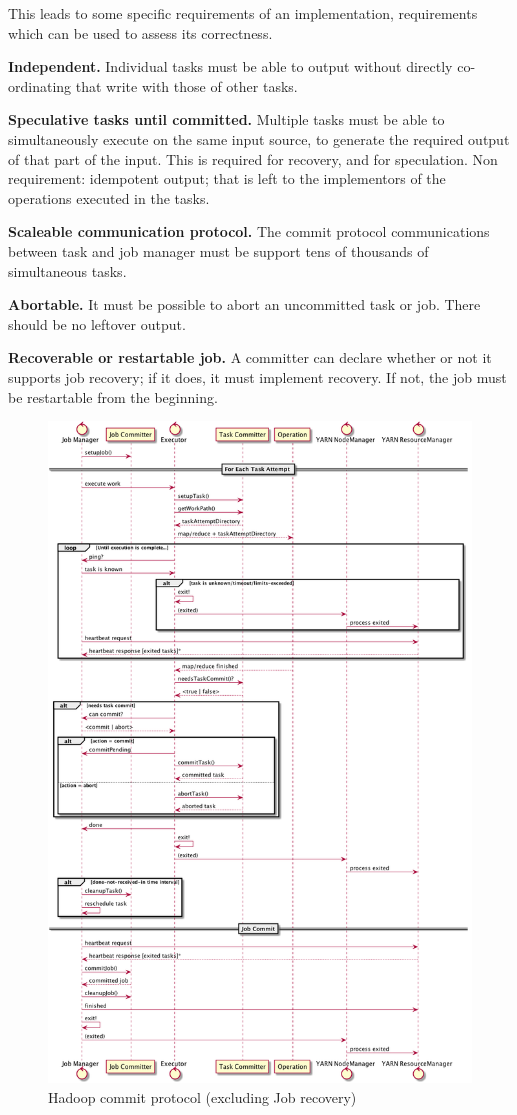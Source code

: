 \documentclass[conference]{IEEEtran}
\begin{document}
This leads to some specific requirements of an implementation, requirements
which can be used to assess its correctness.

\textbf{Independent.}
Individual tasks must be able to output without directly
co-ordinating that write with those of other tasks.

\textbf{Speculative tasks until committed.}
Multiple tasks must be able to simultaneously execute on the same input
source, to generate the required output of that part of the input.
This is required for recovery, and for speculation.
Non requirement: idempotent output;
that is left to the implementors of the operations executed in the tasks.

\textbf{Scaleable communication protocol.}
The commit protocol communications between task and job manager
must be support tens of thousands of simultaneous tasks.

\textbf{Abortable.}
It must be possible to abort an uncommitted task or job.
There should be no leftover output.

\textbf{Recoverable or restartable job.}
A committer can declare whether or not it supports job recovery;
if it does, it must implement recovery.
If not, the job must be restartable from the beginning.

\begin{figure}
  \centering
  \includegraphics[width=.8\textwidth]{commit-protocol.png}
  \caption{Hadoop commit protocol (excluding Job recovery)}
  \label{fig:commit-protocol}
\end{figure}
\end{document}
